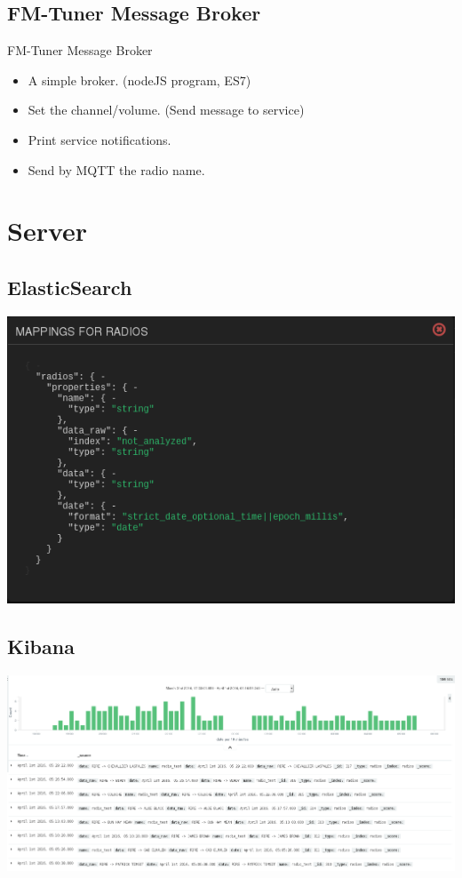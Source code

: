 \documentclass{beamer}
\begin{document}
\subsection{FM-Tuner Message Broker}

\begin{frame}
	\begin{block}{FM-Tuner Message Broker}
		\begin{itemize}
			\item A simple broker. (nodeJS program, ES7)
			\item Set the channel/volume. (Send message to service)
			\item Print service notifications.
			\item Send by MQTT the radio name.
		\end{itemize}
	\end{block}
\end{frame}

\section{Server}

\subsection{ElasticSearch}

\begin{frame}
	\begin{center}
		\includegraphics[scale=0.50]{mapping.png}
	\end{center}
\end{frame}

\subsection{Kibana}

\begin{frame}
	\begin{center}
		\includegraphics[scale=0.20]{frequence.png}
	\end{center}
\end{frame}
\end{document}
